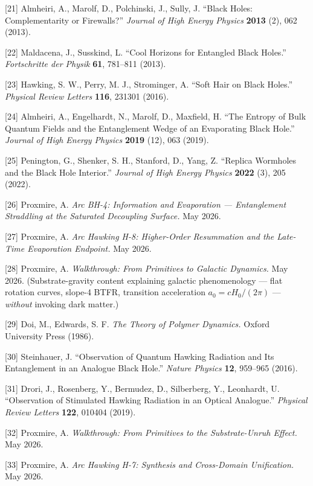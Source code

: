 \documentclass[
  11pt,
  a4paperpaper,
]{article}
\begin{document}
{[}21{]} Almheiri, A., Marolf, D., Polchinski, J., Sully, J. ``Black
Holes: Complementarity or Firewalls?'' \emph{Journal of High Energy
Physics} \textbf{2013} (2), 062 (2013).

{[}22{]} Maldacena, J., Susskind, L. ``Cool Horizons for Entangled Black
Holes.'' \emph{Fortschritte der Physik} \textbf{61}, 781--811 (2013).

{[}23{]} Hawking, S. W., Perry, M. J., Strominger, A. ``Soft Hair on
Black Holes.'' \emph{Physical Review Letters} \textbf{116}, 231301
(2016).

{[}24{]} Almheiri, A., Engelhardt, N., Marolf, D., Maxfield, H. ``The
Entropy of Bulk Quantum Fields and the Entanglement Wedge of an
Evaporating Black Hole.'' \emph{Journal of High Energy Physics}
\textbf{2019} (12), 063 (2019).

{[}25{]} Penington, G., Shenker, S. H., Stanford, D., Yang, Z. ``Replica
Wormholes and the Black Hole Interior.'' \emph{Journal of High Energy
Physics} \textbf{2022} (3), 205 (2022).

{[}26{]} Proxmire, A. \emph{Arc BH-4: Information and Evaporation ---
Entanglement Straddling at the Saturated Decoupling Surface.} May 2026.

{[}27{]} Proxmire, A. \emph{Arc Hawking H-8: Higher-Order Resummation
and the Late-Time Evaporation Endpoint.} May 2026.

{[}28{]} Proxmire, A. \emph{Walkthrough: From Primitives to Galactic
Dynamics.} May 2026. (Substrate-gravity content explaining galactic
phenomenology --- flat rotation curves, slope-4 BTFR, transition
acceleration \(a_0 = cH_0/(2\pi)\) --- \emph{without} invoking dark
matter.)

{[}29{]} Doi, M., Edwards, S. F. \emph{The Theory of Polymer Dynamics.}
Oxford University Press (1986).

{[}30{]} Steinhauer, J. ``Observation of Quantum Hawking Radiation and
Its Entanglement in an Analogue Black Hole.'' \emph{Nature Physics}
\textbf{12}, 959--965 (2016).

{[}31{]} Drori, J., Rosenberg, Y., Bermudez, D., Silberberg, Y.,
Leonhardt, U. ``Observation of Stimulated Hawking Radiation in an
Optical Analogue.'' \emph{Physical Review Letters} \textbf{122}, 010404
(2019).

{[}32{]} Proxmire, A. \emph{Walkthrough: From Primitives to the
Substrate-Unruh Effect.} May 2026.

{[}33{]} Proxmire, A. \emph{Arc Hawking H-7: Synthesis and Cross-Domain
Unification.} May 2026.
\end{document}

